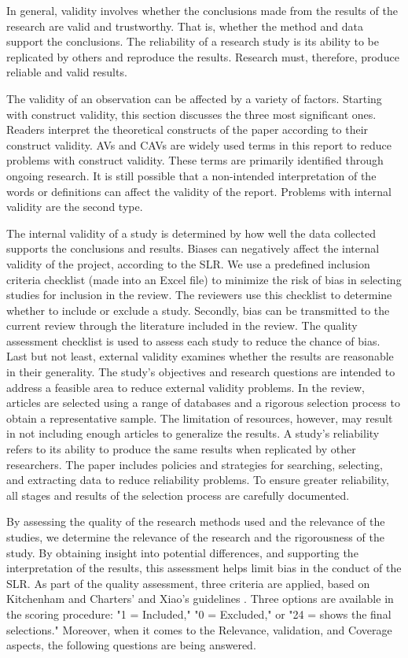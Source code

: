 \documentclass[a4paper,12pt]{article}
\begin{document}
\hspace{5mm} In general, validity involves whether the conclusions made from the results of the research are valid and trustworthy. That is, whether the method and data support the conclusions. The reliability of a research study is its ability to be replicated by others and reproduce the results. Research must, therefore, produce reliable and valid results.\par
The validity of an observation can be affected by a variety of factors. Starting with construct validity, this section discusses the three most significant ones. Readers interpret the theoretical constructs of the paper according to their construct validity. AVs and CAVs are widely used terms in this report to reduce problems with construct validity. These terms are primarily identified through ongoing research. It is still possible that a non-intended interpretation of the words or definitions can affect the validity of the report. Problems with internal validity are the second type.\par
The internal validity of a study is determined by how well the data collected supports the conclusions and results. Biases can negatively affect the internal validity of the project, according to the SLR. We use a predefined inclusion criteria checklist (made into an Excel file) to minimize the risk of bias in selecting studies for inclusion in the review. The reviewers use this checklist to determine whether to include or exclude a study. Secondly, bias can be transmitted to the current review through the literature included in the review. The quality assessment checklist is used to assess each study to reduce the chance of bias. Last but not least, external validity examines whether the results are reasonable in their generality. The study's objectives and research questions are intended to address a feasible area to reduce external validity problems. In the review, articles are selected using a range of databases and a rigorous selection process to obtain a representative sample. The limitation of resources, however, may result in not including enough articles to generalize the results. A study's reliability refers to its ability to produce the same results when replicated by other researchers. The paper includes policies and strategies for searching, selecting, and extracting data to reduce reliability problems. To ensure greater reliability, all stages and results of the selection process are carefully documented.

By assessing the quality of the research methods used and the relevance of the studies, we determine the relevance of the research and the rigorousness of the study. By obtaining insight into potential differences, and supporting the interpretation of the results, this assessment helps limit bias in the conduct of the SLR. As part of the quality assessment, three criteria are applied, based on Kitchenham and Charters' and Xiao's guidelines \cite{article10,article11}. Three options are available in the scoring procedure: "1 = Included," "0 = Excluded," or "24 = shows the final selections." Moreover, when it comes to the Relevance, validation, and Coverage aspects, the following questions are being answered.
\end{document}
